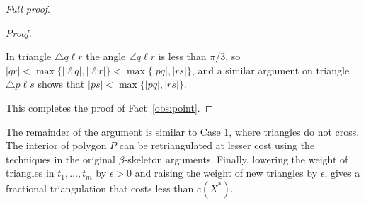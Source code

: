 \documentclass[final]{siamltex}
\newcommand{\cost}{c}
\newcommand{\polygon}{P}
\newcommand{\fracTriang}{X}
\newenvironment{fullproof}{\par{\it Full proof}. \ignorespaces}{\endproof}
\begin{document}
\begin{fullproof}
\begin{proof}
\begin{window}
\hspace*{\parindent}
In triangle $\triangle{q \ell r}$ the angle $\angle{q \ell r}$ is less than $\pi/3$, so 
$|q r| < \max\{|\ell q|,|\ell r|\} < \max\{|p q|,|r s|\}$, 
and a similar argument on triangle $\triangle{p \ell s}$ shows that $|p s|< \max\{|p q|,|r s|\}$.
\end{window}
This completes the proof of Fact~\ref{obs:point}.
\end{proof}

The remainder of the argument is similar to Case 1, where triangles do not cross.
The interior of polygon $\polygon$ can be retriangulated at lesser cost using the techniques
in the original $\beta$-skeleton arguments. 
Finally, lowering the weight of triangles in $t_1,\ldots,t_m$ by $\epsilon>0$
and raising the weight of new triangles by $\epsilon$,
gives a fractional triangulation that costs less than $\cost(\fracTriang^*)$.





\end{fullproof}
\end{document}
